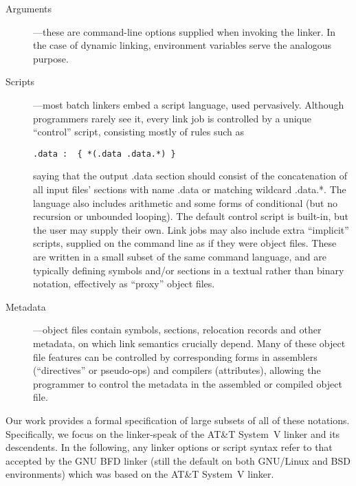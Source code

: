 \begin{description}

\item[Arguments] ---these are command-line options supplied when invoking the linker.
In the case of dynamic linking, environment variables serve the analogous purpose.

\item[Scripts] ---most batch linkers embed a script language, used pervasively.
Although programmers rarely see it, every link job is controlled by a unique ``control'' script,
consisting mostly of rules such as 

\begin{lstlisting}[language=plain,basicstyle=\footnotesize\sffamily]
  .data :  { *(.data .data.*) }
\end{lstlisting}

saying that the output \textsf{.data} section should consist of the concatenation of 
all input files' sections with name \textsf{.data} or matching wildcard \textsf{.data.*}.
The language also includes arithmetic and some forms of conditional (but no recursion or unbounded looping).
The default control script is built-in, but the user may supply their own.
Link jobs may also include extra ``implicit'' scripts, 
supplied on the command line as if they were object files.
These are written in a small subset of the same command language, and are typically 
defining symbols and/or sections in a textual rather than binary notation, effectively
as ``proxy'' object files.

\item[Metadata] ---object files contain symbols, sections, relocation records
and other metadata, on which link semantics crucially depend. Many of these 
object file features can be controlled by corresponding forms in assemblers 
(``directives'' or pseudo-ops) and compilers (attributes), allowing the programmer
to control the metadata in the assembled or compiled object file.

\end{description}

Our work provides a formal specification
of large subsets of all of these notations.
Specifically, we focus on the linker-speak of the AT\&T System~V linker
and its descendents. 
In the following, any linker options or script syntax
refer to that accepted by the GNU BFD linker
(still the default on both GNU/Linux and BSD environments)
which was based on the AT\&T System~V linker.



